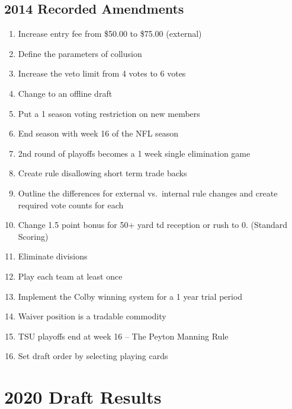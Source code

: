 \documentclass[
]{book}
\providecommand{\tightlist}{%
  \setlength{\itemsep}{0pt}\setlength{\parskip}{0pt}}
\begin{document}
\hypertarget{recorded-amendments-6}{%
\section{2014 Recorded Amendments}\label{recorded-amendments-6}}

\begin{enumerate}
\def\labelenumi{\arabic{enumi}.}
\tightlist
\item
  Increase entry fee from \$50.00 to \$75.00 (external)
\item
  Define the parameters of collusion
\item
  Increase the veto limit from 4 votes to 6 votes
\item
  Change to an offline draft
\item
  Put a 1 season voting restriction on new members
\item
  End season with week 16 of the NFL season
\item
  2nd round of playoffs becomes a 1 week single elimination game
\item
  Create rule disallowing short term trade backs
\item
  Outline the differences for external vs.~internal rule changes and create required vote counts for each
\item
  Change 1.5 point bonus for 50+ yard td reception or rush to 0. (Standard Scoring)
\item
  Eliminate divisions
\item
  Play each team at least once
\item
  Implement the Colby winning system for a 1 year trial period
\item
  Waiver position is a tradable commodity
\item
  TSU playoffs end at week 16 -- The Peyton Manning Rule
\item
  Set draft order by selecting playing cards
\end{enumerate}

\hypertarget{draft-results}{%
\chapter{2020 Draft Results}\label{draft-results}}

  
\end{document}
